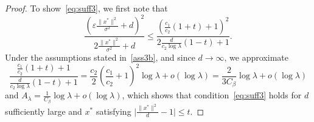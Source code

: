 \begin{proof}
To show~\eqref{eq:suff3}, we first note that 
$$\frac{(\varepsilon\frac{\lVert x^*\rVert^2}{\sigma^2}+d)^2}{2\frac{\lVert x^*\rVert^2}{\sigma^2}+d} \leq \frac{\left(\frac{c_1}{c_2}(1+t)+1\right)^2}{2\frac{d}{c_2\log\lambda}(1-t)+1}.$$ 
Under the assumptions stated in~\eqref{ass3b}, and since $d\rightarrow\infty$, we approximate $$\frac{\frac{c_1}{c_2}(1+t)+1}{\frac{d}{c_2\log\lambda}(1-t)+1}=\frac{c_2}{2}\left(\frac{c_1}{c_2}+1\right)^2\log \lambda+o(\log \lambda) = \frac{2}{3 C_\beta} \log \lambda+o(\log \lambda)$$ 
and $A_\lambda= \frac{1}{C_\beta}\log \lambda+o(\log\lambda)$, which shows that condition~\ref{eq:suff3} holds for $d$ sufficiently large and $x^*$ satisfying $\lvert\frac{\lVert x^*\rVert^2}{d}-1\rvert\leq t$. 
\end{proof}

